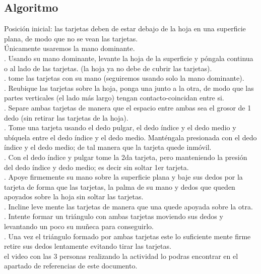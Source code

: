 \documentclass{article}
\begin{document}
\subsection{Algoritmo}
Posición inicial: las tarjetas deben de estar debajo de la hoja en una superficie plana, de modo que no se vean las tarjetas.\\
\newline
Únicamente usaremos la mano dominante.\\
. Usando su mano dominante, levante la hoja de la superficie y póngala continua o al lado de las tarjetas. (la hoja ya no debe de cubrir las tarjetas).\\
. tome las tarjetas con su mano (seguiremos usando solo la mano dominante).\\
. Reubique las tarjetas sobre la hoja, ponga una junto a la otra, de modo que las partes verticales (el lado más largo) tengan contacto-coincidan entre si.\\
. Separe ambas tarjetas de manera que el espacio entre ambas sea el grosor de 1 dedo (sin retirar las tarjetas de la hoja).\\
.	Tome una tarjeta usando el dedo pulgar, el dedo índice y el dedo medio y ubíquela entre el dedo índice y el dedo medio. Manténgala presionada con el dedo índice y el dedo medio; de tal manera que la tarjeta quede inmóvil.\\
.	Con el dedo índice y pulgar tome la 2da tarjeta, pero manteniendo la presión del dedo índice y dedo medio; es decir sin soltar 1er tarjeta.\\
.	Apoye firmemente su mano sobre la superficie plana y baje sus dedos por la tarjeta de forma que las tarjetas, la palma de su mano y dedos que queden apoyados sobre la hoja sin soltar las tarjetas.\\
.	Incline leve mente las tarjetas de manera que una quede apoyada sobre la otra.\\
.	Intente formar un triángulo con ambas tarjetas moviendo sus dedos y levantando un poco su muñeca para conseguirlo.\\
.	Una vez el triángulo formado por ambas tarjetas este lo suficiente mente firme retire sus dedos lentamente evitando tirar las tarjetas.\\
\newline
el video con las 3 personas realizando la actividad lo podras encontrar en el apartado de referencias de este documento.\cite{YouTube}
\end{document}
